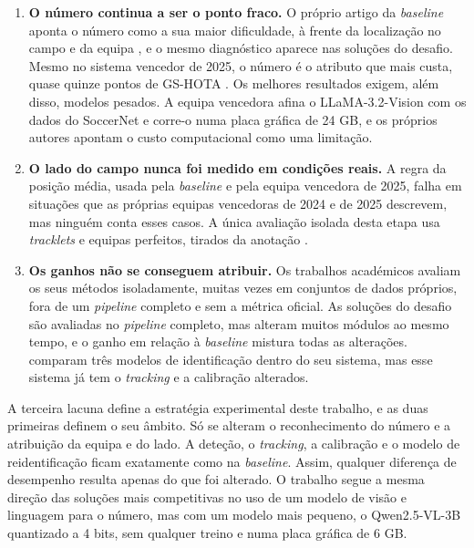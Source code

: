\begin{enumerate}
    \item \textbf{O número continua a ser o ponto fraco.} O próprio artigo da \emph{baseline} aponta o número como a sua maior dificuldade, à frente da localização no campo e da equipa \citep{somers2024soccernet}, e o mesmo diagnóstico aparece nas soluções do desafio. Mesmo no sistema vencedor de 2025, o número é o atributo que mais custa, quase quinze pontos de GS-HOTA \citep{oo2026broadcast2pitch}. Os melhores resultados exigem, além disso, modelos pesados. A equipa vencedora afina o LLaMA-3.2-Vision com os dados do SoccerNet e corre-o numa placa gráfica de 24 GB, e os próprios autores apontam o custo computacional como uma limitação.

    \item \textbf{O lado do campo nunca foi medido em condições reais.} A regra da posição média, usada pela \emph{baseline} e pela equipa vencedora de 2025, falha em situações que as próprias equipas vencedoras de 2024 e de 2025 descrevem, mas ninguém conta esses casos. A única avaliação isolada desta etapa usa \emph{tracklets} e equipas perfeitos, tirados da anotação \citep{somers2024soccernet}.

    \item \textbf{Os ganhos não se conseguem atribuir.} Os trabalhos académicos avaliam os seus métodos isoladamente, muitas vezes em conjuntos de dados próprios, fora de um \emph{pipeline} completo e sem a métrica oficial. As soluções do desafio são avaliadas no \emph{pipeline} completo, mas alteram muitos módulos ao mesmo tempo, e o ganho em relação à \emph{baseline} mistura todas as alterações. \citet{oo2026broadcast2pitch} comparam três modelos de identificação dentro do seu sistema, mas esse sistema já tem o \emph{tracking} e a calibração alterados.
\end{enumerate}

A terceira lacuna define a estratégia experimental deste trabalho, e as duas primeiras definem o seu âmbito. Só se alteram o reconhecimento do número e a atribuição da equipa e do lado. A deteção, o \emph{tracking}, a calibração e o modelo de reidentificação ficam exatamente como na \emph{baseline}. Assim, qualquer diferença de desempenho resulta apenas do que foi alterado. O trabalho segue a mesma direção das soluções mais competitivas no uso de um modelo de visão e linguagem para o número, mas com um modelo mais pequeno, o Qwen2.5-VL-3B quantizado a 4 bits, sem qualquer treino e numa placa gráfica de 6 GB.
